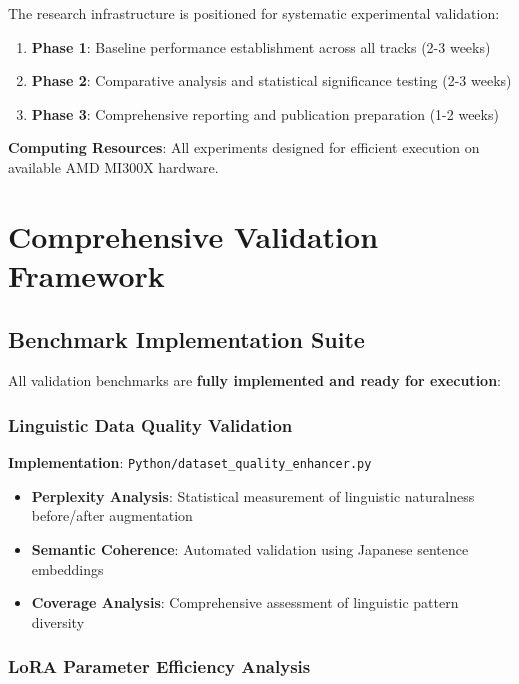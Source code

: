 \documentclass[12pt,a4paper]{article}
\begin{document}
The research infrastructure is positioned for systematic experimental validation:

\begin{enumerate}
\item \textbf{Phase 1}: Baseline performance establishment across all tracks (2-3 weeks)
\item \textbf{Phase 2}: Comparative analysis and statistical significance testing (2-3 weeks)
\item \textbf{Phase 3}: Comprehensive reporting and publication preparation (1-2 weeks)
\end{enumerate}

\textbf{Computing Resources}: All experiments designed for efficient execution on available AMD MI300X hardware.

\section{Comprehensive Validation Framework}

\subsection{Benchmark Implementation Suite}

All validation benchmarks are \textbf{fully implemented and ready for execution}:

\subsubsection{Linguistic Data Quality Validation}

\textbf{Implementation}: \texttt{Python/dataset\_quality\_enhancer.py}

\begin{itemize}
\item \textbf{Perplexity Analysis}: Statistical measurement of linguistic naturalness before/after augmentation
\item \textbf{Semantic Coherence}: Automated validation using Japanese sentence embeddings
\item \textbf{Coverage Analysis}: Comprehensive assessment of linguistic pattern diversity
\end{itemize}

\subsubsection{LoRA Parameter Efficiency Analysis}
\end{document}

